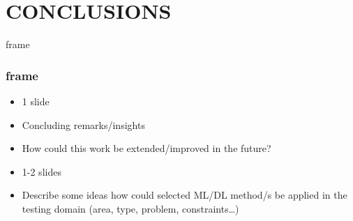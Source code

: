 \section{CONCLUSIONS}
\label{conclusion}


\begin{frame}{frame} %
    \frametitle{frame}
    \begin{itemize}
        \item 1 slide
        \item Concluding remarks/insights
        \item How could this work be extended/improved in the future?
        
        \item 1-2 slides
        \item Describe some ideas how could selected ML/DL method/s be applied in the testing domain (area, type, problem, constraints…)
        
    \end{itemize}
\end{frame}